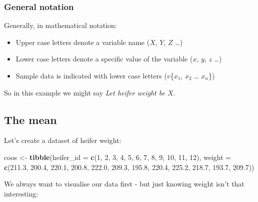 \documentclass[
]{book}
\newenvironment{Shaded}{\begin{snugshade}}{\end{snugshade}}
\newcommand{\DataTypeTok}[1]{\textcolor[rgb]{0.13,0.29,0.53}{#1}}
\newcommand{\DecValTok}[1]{\textcolor[rgb]{0.00,0.00,0.81}{#1}}
\newcommand{\FloatTok}[1]{\textcolor[rgb]{0.00,0.00,0.81}{#1}}
\newcommand{\KeywordTok}[1]{\textcolor[rgb]{0.13,0.29,0.53}{\textbf{#1}}}
\newcommand{\NormalTok}[1]{#1}
\newcommand{\StringTok}[1]{\textcolor[rgb]{0.31,0.60,0.02}{#1}}
\begin{document}
\hypertarget{general-notation}{%
\subsubsection{General notation}\label{general-notation}}

Generally, in mathematical notation:

\begin{itemize}
\item
  Upper case letters denote a variable name (\(X\), \(Y\), \(Z\) \ldots{})
\item
  Lower case letters denote a specific value of the variable (\(x\), \(y\), \(z\) \ldots{})
\item
  Sample data is indicated with lower case letters (\(v\)\{\(x_1\), \(x_2\) \ldots{} \(x_n\)\})
\end{itemize}

So in this example we might say \emph{Let heifer weight be \(X\)}.

\hypertarget{stats_mean}{%
\subsection{The mean}\label{stats_mean}}

Let's create a dataset of heifer weight:

\begin{Shaded}
\begin{Highlighting}[]
\NormalTok{coos <-}\StringTok{ }\KeywordTok{tibble}\NormalTok{(}\DataTypeTok{heifer_id =} \KeywordTok{c}\NormalTok{(}\DecValTok{1}\NormalTok{, }\DecValTok{2}\NormalTok{, }\DecValTok{3}\NormalTok{, }\DecValTok{4}\NormalTok{, }\DecValTok{5}\NormalTok{, }\DecValTok{6}\NormalTok{, }\DecValTok{7}\NormalTok{, }\DecValTok{8}\NormalTok{, }\DecValTok{9}\NormalTok{, }\DecValTok{10}\NormalTok{, }\DecValTok{11}\NormalTok{, }\DecValTok{12}\NormalTok{),}
               \DataTypeTok{weight =} \KeywordTok{c}\NormalTok{(}\FloatTok{211.3}\NormalTok{, }\FloatTok{200.4}\NormalTok{, }\FloatTok{220.1}\NormalTok{, }\FloatTok{200.8}\NormalTok{, }\FloatTok{222.0}\NormalTok{, }\FloatTok{209.3}\NormalTok{, }
                          \FloatTok{195.8}\NormalTok{, }\FloatTok{220.4}\NormalTok{, }\FloatTok{225.2}\NormalTok{, }\FloatTok{218.7}\NormalTok{, }\FloatTok{193.7}\NormalTok{, }\FloatTok{209.7}\NormalTok{))}
\end{Highlighting}
\end{Shaded}

We always want to visualise our data first - but just knowing weight isn't that interesting:
\end{document}
